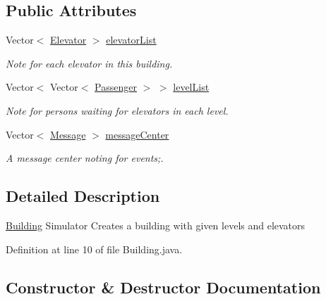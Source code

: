 \subsection*{Public Attributes}
\begin{DoxyCompactItemize}
\item 
Vector$<$ \hyperlink{classcn_1_1leonwong_1_1_elevator_simulator_1_1_model_1_1_elevator}{Elevator} $>$ \hyperlink{classcn_1_1leonwong_1_1_elevator_simulator_1_1_model_1_1_building_a8317933aa9a1de07f64a8de984e19551}{elevator\+List}
\begin{DoxyCompactList}\small\item\em Note for each elevator in this building. \end{DoxyCompactList}\item 
Vector$<$ Vector$<$ \hyperlink{classcn_1_1leonwong_1_1_elevator_simulator_1_1_model_1_1_passenger}{Passenger} $>$ $>$ \hyperlink{classcn_1_1leonwong_1_1_elevator_simulator_1_1_model_1_1_building_ae720233ad2086c6f427facb19df4fb33}{level\+List}
\begin{DoxyCompactList}\small\item\em Note for persons waiting for elevators in each level. \end{DoxyCompactList}\item 
Vector$<$ \hyperlink{classcn_1_1leonwong_1_1_elevator_simulator_1_1_model_1_1_message}{Message} $>$ \hyperlink{classcn_1_1leonwong_1_1_elevator_simulator_1_1_model_1_1_building_a01f6bba8a7c8f2a26a34f7ee8c055275}{message\+Center}
\begin{DoxyCompactList}\small\item\em A message center noting for events;. \end{DoxyCompactList}\end{DoxyCompactItemize}


\subsection{Detailed Description}
\hyperlink{classcn_1_1leonwong_1_1_elevator_simulator_1_1_model_1_1_building}{Building} Simulator Creates a building with given levels and elevators 

Definition at line 10 of file Building.\+java.



\subsection{Constructor \& Destructor Documentation}
\mbox{\label{classcn_1_1leonwong_1_1_elevator_simulator_1_1_model_1_1_building_a1e083b2c0741e1b45d620401f67b51c3}} 
